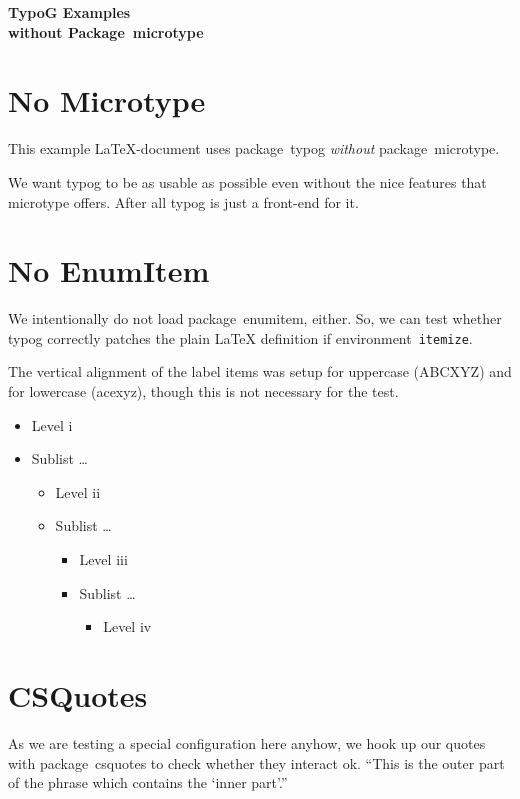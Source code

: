 \documentclass[]{article}
\newcommand*{\packagename}[1]{\mbox{\textsf{#1}}}
\begin{document}
\begin{center}
  \Huge\bf\sf
  TypoG Examples  \\
  without Package~\packagename{microtype}
\end{center}

\bigskip

\section*{No Microtype}

This example \LaTeX-document uses package~\packagename{typog}
\emph{without} package~\packagename{microtype}.

We want \packagename{typog} to be as usable as possible even without
the nice features that \packagename{microtype} offers.
After all \packagename{typog} is just a front-end for it.

\section*{No EnumItem}

We intentionally do not load package~\packagename{enumitem}, either.
So, we can test whether \packagename{typog} correctly patches the
plain \LaTeX{} definition if environment~\texttt{itemize}.

The vertical alignment of the label items was setup for
uppercase (ABCXYZ) and for
lowercase (acexyz), though
this is not necessary for the test.

\uppercaseadjustlabelitems{*}
\begin{itemize}
\item Level i
\item Sublist \dots
  \begin{itemize}
  \item Level ii
  \item Sublist \dots
    \begin{itemize}
    \item Level iii
    \item Sublist \dots
      \begin{itemize}
      \item Level iv
      \end{itemize}
    \end{itemize}
  \end{itemize}
\end{itemize}

\section*{CSQuotes}

As we are testing a special configuration here anyhow,
we hook up our quotes with package~csquotes
to check whether they interact ok.
{%
  \enquote{This is the outer part of the phrase
    which contains the \enquote{inner part}.}}
\end{document}
